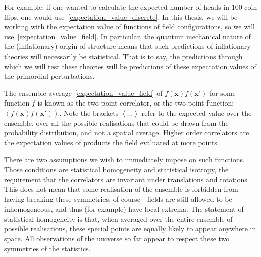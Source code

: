     For example, if one wanted to
    calculate the expected number of heads in $100$
    coin flips, one would use~\eqref{expectation_value_discrete}.
    In this thesis, we will be working with the expectation value of
    functions of field configurations, so we will use~\eqref{expectation_value_field}.
    In particular, the quantum mechanical nature of the (inflationary)
    origin of structure means that such predictions
    of inflationary theories will necessarily be statistical. That is to say, the predictions through
    which we will test these theories will be predictions of these expectation
    values of the primordial perturbations.


    The ensemble average~\eqref{expectation_value_field} of
    $f(\mathbf{x})f(\mathbf{x'})$ for some function $f$ is known as the
    two-point correlator, or the two-point function: $\left<f(\mathbf{x})f(\mathbf{x'})\right>$.
    Note the brackets $\left<\ldots\right>$ refer to the expected value over the ensemble,
    over all the possible realisations that could be drawn from the probability
    distribution, and not a spatial average.
    Higher order correlators are the
    expectation values of products the field evaluated at more points.


    There are two assumptions we wish to immediately impose on such functions.
    Those conditions are statistical homogeneity and statistical isotropy,
    the requirement that the correlators are invariant under translations and rotations.
    This does not mean that some realisation of the ensemble is forbidden from having
    breaking these symmetries, of course---fields
    are still allowed to be inhomogeneous, and thus (for example) have local extrema.
    The statement of statistical homogeneity is that,
    when averaged over the entire ensemble of possible realisations, these special points
    are equally likely to appear anywhere in space.
    All observations of the universe so far appear to respect these two symmetries of the statistics.



